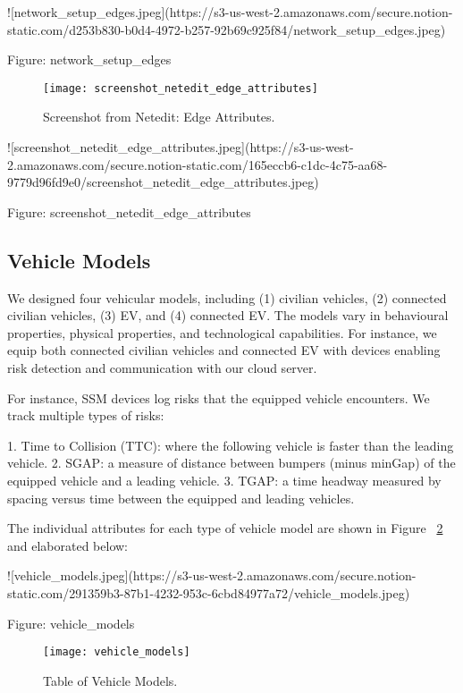 ![network_setup_edges.jpeg](https://s3-us-west-2.amazonaws.com/secure.notion-static.com/d253b830-b0d4-4972-b257-92b69c925f84/network_setup_edges.jpeg)

Figure: network_setup_edges

\begin{figure}
\texttt{[image: screenshot\_netedit\_edge\_attributes]}
\caption{Screenshot from Netedit: Edge Attributes.}
\label{fig:screenshot_netedit_edge_attributes}
\end{figure}

![screenshot_netedit_edge_attributes.jpeg](https://s3-us-west-2.amazonaws.com/secure.notion-static.com/165eccb6-c1dc-4c75-aa68-9779d96fd9e0/screenshot_netedit_edge_attributes.jpeg)

Figure: screenshot_netedit_edge_attributes

\subsection{Vehicle Models}

We designed four vehicular models, including (1) civilian vehicles, (2) connected civilian vehicles, (3) \acrshort{EV}, and (4) connected \acrshort{EV}. The models vary in behavioural properties, physical properties, and technological capabilities. For instance, we equip both connected civilian vehicles and connected \acrshort{EV} with devices enabling risk detection and communication with our cloud server. 

For instance, SSM devices log risks that the equipped vehicle encounters. We track multiple types of risks:

1. Time to Collision (TTC): where the following vehicle is faster than the leading vehicle.
2. SGAP: a measure of distance between bumpers (minus minGap) of the equipped vehicle and a leading vehicle.
3. TGAP: a time headway measured by spacing versus time between the equipped and leading vehicles.

The individual attributes for each type of vehicle model are shown in Figure ~\ref{fig:vehicle_models} and elaborated below:

![vehicle_models.jpeg](https://s3-us-west-2.amazonaws.com/secure.notion-static.com/291359b3-87b1-4232-953c-6cbd84977a72/vehicle_models.jpeg)

Figure: vehicle_models

\begin{figure}
\texttt{[image: vehicle\_models]}
\caption{Table of Vehicle Models.}
\label{fig:vehicle_models}
\end{figure}

